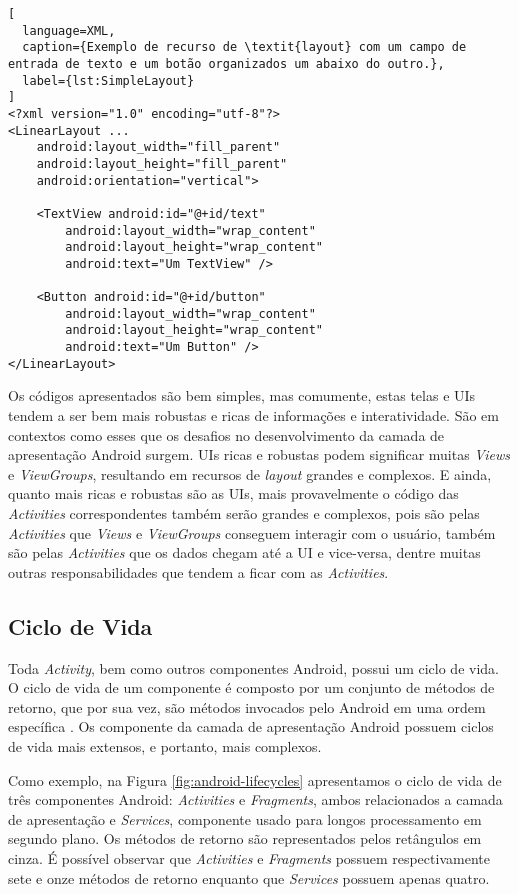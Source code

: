 \begin{lstlisting}[
  language=XML, 
  caption={Exemplo de recurso de \textit{layout} com um campo de entrada de texto e um botão organizados um abaixo do outro.}, 
  label={lst:SimpleLayout}
]
<?xml version="1.0" encoding="utf-8"?>
<LinearLayout ...
    android:layout_width="fill_parent"
    android:layout_height="fill_parent"
    android:orientation="vertical">

    <TextView android:id="@+id/text"
        android:layout_width="wrap_content"
        android:layout_height="wrap_content"
        android:text="Um TextView" />

    <Button android:id="@+id/button"
        android:layout_width="wrap_content"
        android:layout_height="wrap_content"
        android:text="Um Button" />
</LinearLayout>
\end{lstlisting}

Os códigos apresentados são bem simples, mas comumente, estas telas e \acs{UI}s tendem a ser bem mais robustas e ricas de informações e interatividade. São em contextos como esses que os desafios no desenvolvimento da camada de apresentação Android surgem. \acs{UI}s ricas e robustas podem significar muitas \textit{Views} e \textit{ViewGroups}, resultando em recursos de \textit{layout} grandes e complexos. E ainda, quanto mais ricas e robustas são as \acs{UI}s, mais provavelmente o código das \textit{Activities} correspondentes também serão grandes e complexos, pois são pelas \textit{Activities} que \textit{Views} e \textit{ViewGroups} conseguem interagir com o usuário, também são pelas \textit{Activities} que os dados chegam até a \acs{UI} e vice-versa, dentre muitas outras responsabilidades que tendem a ficar com as \textit{Activities}.

\subsection{Ciclo de Vida}

Toda \textit{Activity}, bem como outros componentes Android, possui um ciclo de vida. O ciclo de vida de um componente é composto por um conjunto de métodos de retorno, que por sua vez, são métodos invocados pelo Android em uma ordem específica \cite{AndroidActivities2016}. Os componente da camada de apresentação Android possuem ciclos de vida mais extensos, e portanto, mais complexos. 

Como exemplo, na Figura \ref{fig:android-lifecycles} apresentamos o ciclo de vida de três componentes Android: \textit{Activities} e \textit{Fragments}, ambos relacionados a camada de apresentação e \textit{Services}, componente usado para longos processamento em segundo plano. Os métodos de retorno são representados pelos retângulos em cinza. É possível observar que \textit{Activities} e \textit{Fragments} possuem respectivamente sete e onze métodos de retorno enquanto que \textit{Services} possuem apenas quatro.

